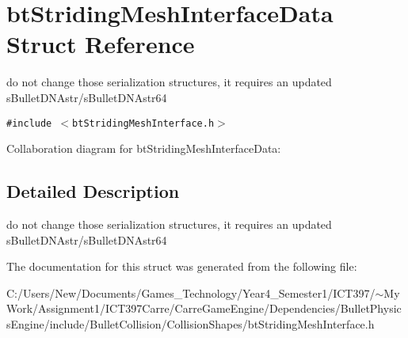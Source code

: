 \hypertarget{structbt_striding_mesh_interface_data}{
\section{btStridingMeshInterfaceData Struct Reference}
\label{structbt_striding_mesh_interface_data}
}
do not change those serialization structures, it requires an updated sBulletDNAstr/sBulletDNAstr64  


{\tt \#include $<$btStridingMeshInterface.h$>$}

Collaboration diagram for btStridingMeshInterfaceData:

\subsection{Detailed Description}
do not change those serialization structures, it requires an updated sBulletDNAstr/sBulletDNAstr64 

The documentation for this struct was generated from the following file:\begin{CompactItemize}
\item 
C:/Users/New/Documents/Games\_\-Technology/Year4\_\-Semester1/ICT397/$\sim$My Work/Assignment1/ICT397Carre/CarreGameEngine/Dependencies/BulletPhysicsEngine/include/BulletCollision/CollisionShapes/btStridingMeshInterface.h\end{CompactItemize}
